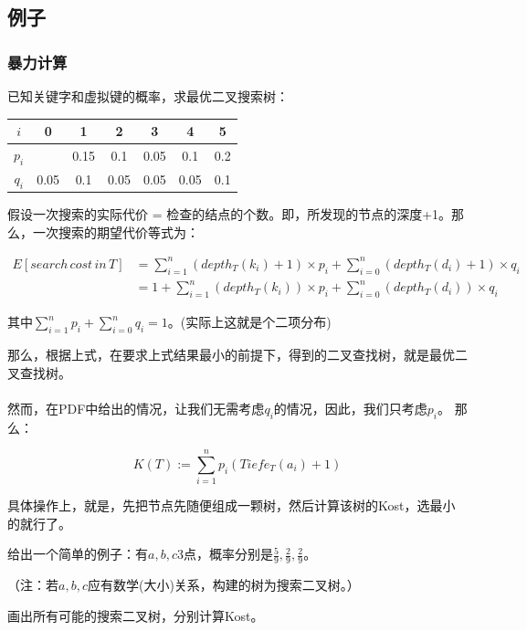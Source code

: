 \documentclass[a4paper]{article}    %
\begin{document}
\subsection{例子}

\subsubsection{暴力计算}

已知关键字和虚拟键的概率，求最优二叉搜索树：

\begin{center}
    \begin{tabular}{|c|c|c|c|c|c|c|}
        \hline
        $i$&0&1&2&3&4&5\\
        \hline
        $p_i$&&0.15&0.1&0.05&0.1&0.2\\
        \hline
        $q_i$&0.05&0.1&0.05&0.05&0.05&0.1\\
        \hline
    \end{tabular}
\end{center}

假设一次搜索的实际代价 = 检查的结点的个数。即，所发现的节点的深度+1。那么，一次搜索的期望代价等式为：

\begin{equation}
    \begin{split}
        E[search\, cost\, in\, T]&=\sum^n_{i=1}(depth_T(k_i)+1)\times p_i + \sum^n_{i=0}(depth_T(d_i)+1)\times q_i\\
        &=1+\sum^n_{i=1}(depth_T(k_i))\times p_i + \sum^n_{i=0}(depth_T(d_i))\times q_i
    \end{split}
\end{equation}

其中$\sum^n_{i=1}p_i+\sum^n_{i=0}q_i=1$。(实际上这就是个二项分布)

那么，根据上式，在要求上式结果最小的前提下，得到的二叉查找树，就是最优二叉查找树。
\\
\\
\indent 然而，在PDF中给出的情况，让我们无需考虑$q_i$的情况，因此，我们只考虑$p_i$。
那么：

$$K(T):=\sum^n_{i=1}p_i(Tiefe_T(a_i)+1)$$

具体操作上，就是，先把节点先随便组成一颗树，然后计算该树的Kost，选最小的就行了。

给出一个简单的例子：有$a,b,c$3点，概率分别是$\frac{5}{9},\frac{2}{9},\frac{2}{9}$。

（注：若$a,b,c$应有数学(大小)关系，构建的树为搜索二叉树。）

画出所有可能的搜索二叉树，分别计算Kost。
\end{document}
